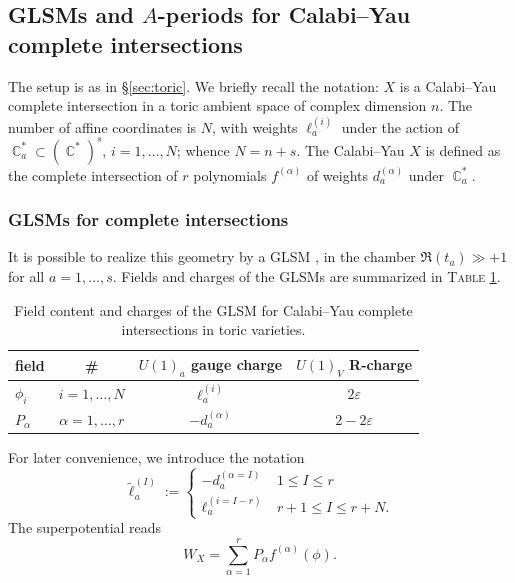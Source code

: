 \documentclass[12pt,a4paper,oneside]{amsart}
\numberwithin{equation}{section}
\theoremstyle{definition}
\theoremstyle{remark}
\DeclareMathOperator{\C}{\mathbb{C}}
\begin{document}
\begin{appendix}
\subsection{GLSMs and \texorpdfstring{$A$}{A}-periods for Calabi--Yau complete intersections}
\label{sec:CICYsetup}

The setup is as in \S\ref{sec:toric}. We briefly recall the notation: $X$ is a Calabi--Yau complete intersection in a toric ambient space of complex dimension $n$. The number of affine coordinates is $N$, with weights $\ell^{(i)}_a$ under the action of $\C^{\ast} _a \subset (\C^{\ast})^s$, $i=1, \dots, N$; whence $N=n+s$. The Calabi--Yau $X$ is defined as the complete intersection of $r$ polynomials $f^{(\alpha)}$ of weights $d_a^{(\alpha)}$ under $\C^{\ast} _a$.\par



\subsubsection{GLSMs for complete intersections} 
It is possible to realize this geometry by a GLSM \cite{Witten:1993yc,Morrison:1994fr}, in the chamber $\Re (t_a) \gg +1$ for all $a=1, \dots, s$. Fields and charges of the GLSMs are summarized in \textsc{Table} \ref{tab:GLSMcharges}.\par

\begin{table}[th]
\centering
\begin{tabular}{l |c |c | c}
	field & \# & $U(1)_a$ gauge charge & $U(1)_V$ R-charge \\
	\hline
	$\phi_i$ & $i=1, \dots, N$ & $\ell_a ^{(i)}$ & $2\varepsilon$ \\
	$P_{\alpha}$ & $\alpha=1, \dots, r$ & $- d_a^{(\alpha)}$ & $2-2\varepsilon$\\
	\hline
\end{tabular}
\caption{Field content and charges of the GLSM for Calabi--Yau complete intersections in toric varieties.}
\label{tab:GLSMcharges}
\end{table}\par
For later convenience, we introduce the notation
\begin{equation}
\label{eq:tildeLCICY}
	\tilde{\ell}_a ^{(I)} := \begin{cases} - d_a ^{(\alpha=I)}  & \ 1 \le I \le r \\ \ell_a ^{(i=I-r)} &  \ r+1 \le I \le r+N . \end{cases}
\end{equation}
The superpotential reads 
\begin{equation*}
	W_X = \sum_{\alpha=1}^{r} P_{\alpha} f^{(\alpha)} (\phi) .
\end{equation*}



\end{appendix}
\end{document}
